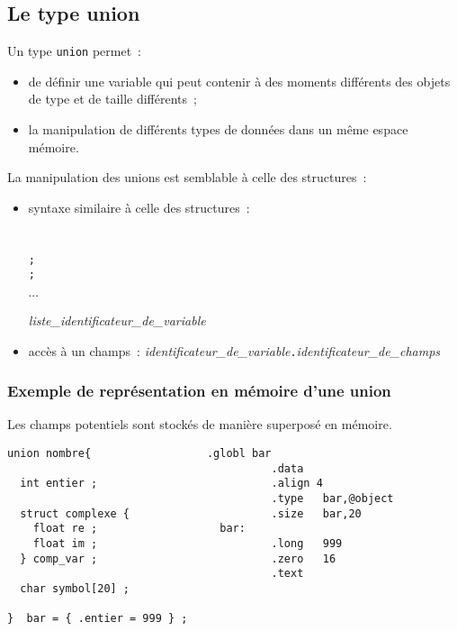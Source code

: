 \begin{frame}
  \section{Le type union}%
  Un type \texttt{union} permet~:
\begin{itemize}
\item de d\'efinir une variable qui peut contenir \`a des moments
  diff\'erents des objets de type et de taille diff\'erents~;
  \item la manipulation de diff\'erents types de donn\'ees dans un
    m\^eme espace m\'emoire.
\end{itemize}
\par\medskip
La manipulation des unions est semblable \`a celle des structures~:
\begin{itemize}
  \item syntaxe similaire \`a celle des structures~:\\
\hspace{3mm}{\it identificateur\_de\_mod\`ele\_d'union} \\
\qquad {\tt \{}\\
\hspace{3mm}{\it liste\_identificateur\_de\_champs}
\hspace{3mm}
{\tt ;}\\
\hspace{3mm}{\it liste\_identificateur\_de\_champs}
\hspace{3mm}
{\tt ;}\\
\begin{center}
	$\cdots$
\end{center}
\qquad {\tt \}}\hspace{3mm}
{\it liste\_identificateur\_de\_variable}\hspace{3mm}{\tt ;}

  \item acc\`es \`a un champs~: {\it identificateur\_de\_variable}{\tt .}{\it identificateur\_de\_champs}
\end{itemize}
\end{frame}
\begin{frame}[fragile]
  \frametitle{Exemple de repr\'esentation en m\'emoire d'une union}%
  Les champs potentiels sont stock\'es de mani\`ere superpos\'e en m\'emoire.
\begin{verbatim}
union nombre{                  .globl bar                    
                                         .data                 
  int entier ;                           .align 4              
                                         .type   bar,@object   
  struct complexe {                      .size   bar,20        
    float re ;                   bar:                          
    float im ;                           .long   999           
  } comp_var ;                           .zero   16            
                                         .text                 
  char symbol[20] ;

}  bar = { .entier = 999 } ;
\end{verbatim}

\end{frame}
